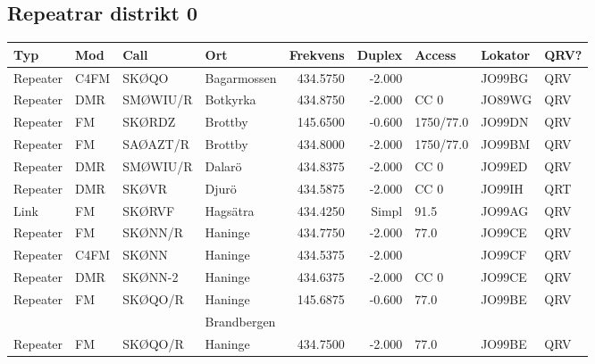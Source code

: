 \begin{landscape}

\subsection{Repeatrar distrikt 0}

\begin{longtable}{llllrrlll}
\bf Typ  & \bf Mod     & \bf Call & \bf Ort     & \bf Frekvens & \bf Duplex & \bf Access & \bf Lokator & \bf QRV? \\ \hline \endhead
Repeater & C4FM        & SKØQO    & Bagarmossen & 434.5750     & -2.000     &            & JO99BG      & QRV      \\
Repeater & DMR         & SMØWIU/R & Botkyrka    & 434.8750     & -2.000     & CC 0       & JO89WG      & QRV      \\
Repeater & FM          & SKØRDZ   & Brottby     & 145.6500     & -0.600     & 1750/77.0  & JO99DN      & QRV      \\
Repeater & FM          & SAØAZT/R & Brottby     & 434.8000     & -2.000     & 1750/77.0  & JO99BM      & QRV      \\
Repeater & DMR         & SMØWIU/R & Dalarö      & 434.8375     & -2.000     & CC 0       & JO99ED      & QRV      \\
Repeater & DMR         & SKØVR    & Djurö       & 434.5875     & -2.000     & CC 0       & JO99IH      & QRT      \\
Link     & FM          & SKØRVF   & Hagsätra    & 434.4250     & Simpl      & 91.5       & JO99AG      & QRV      \\
Repeater & FM          & SKØNN/R  & Haninge     & 434.7750     & -2.000     & 77.0       & JO99CE      & QRV      \\
Repeater & C4FM        & SKØNN    & Haninge     & 434.5375     & -2.000     &            & JO99CF      & QRV      \\
Repeater & DMR         & SKØNN-2  & Haninge     & 434.6375     & -2.000     & CC 0       & JO99CE      & QRV      \\
Repeater & FM          & SKØQO/R  & Haninge     & 145.6875     & -0.600     & 77.0       & JO99BE      & QRV      \\
         &             &          & Brandbergen &              &            &            &             &          \\
Repeater & FM          & SKØQO/R  & Haninge     & 434.7500     & -2.000     & 77.0       & JO99BE      & QRV      \\

\end{longtable}
\end{landscape}
